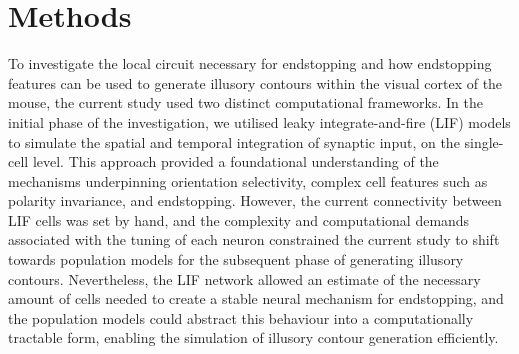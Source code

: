 \documentclass[12pt]{article}
\begin{document}
\section*{Methods}
To investigate the local circuit necessary for endstopping and how endstopping features can be used to generate illusory contours within the visual cortex of the mouse, the current study used two distinct computational frameworks. In the initial phase of the investigation, we utilised leaky integrate-and-fire (LIF) models to simulate the spatial and temporal integration of synaptic input, on the single-cell level. This approach provided a foundational understanding of the mechanisms underpinning orientation selectivity, complex cell features such as polarity invariance, and endstopping. However, the current connectivity between LIF cells was set by hand, and the complexity and computational demands associated with the tuning of each neuron constrained the current study to shift towards population models for the subsequent phase of generating illusory contours. Nevertheless, the LIF network allowed an estimate of the necessary amount of cells needed to create a stable neural mechanism for endstopping, and the population models could abstract this behaviour into a computationally tractable form, enabling the simulation of illusory contour generation efficiently. 
\end{document}

